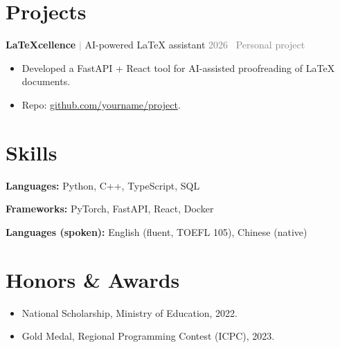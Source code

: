 \documentclass[10pt, a4paper]{article}
\newcommand{\entry}[4]{%
  \textbf{#1} \textcolor{graytext}{$\vert$} #2
  \hfill \textcolor{graytext}{#3 \, #4}\par
  \vspace{0.15em}
}
\newcommand{\skill}[2]{\textbf{#1:} #2\par}
\begin{document}
\section{Projects}
\entry{LaTeXcellence}{AI-powered LaTeX assistant}{2026}{Personal project}
\begin{itemize}
  \item Developed a FastAPI + React tool for AI-assisted proofreading of \LaTeX{} documents.
  \item Repo: \href{https://github.com/yourname/project}{github.com/yourname/project}.
\end{itemize}

\section{Skills}
\skill{Languages}{Python, C++, TypeScript, SQL}
\skill{Frameworks}{PyTorch, FastAPI, React, Docker}
\skill{Languages (spoken)}{English (fluent, TOEFL 105), Chinese (native)}

\section{Honors \& Awards}
\begin{itemize}
  \item National Scholarship, Ministry of Education, 2022.
  \item Gold Medal, Regional Programming Contest (ICPC), 2023.
\end{itemize}
\end{document}
